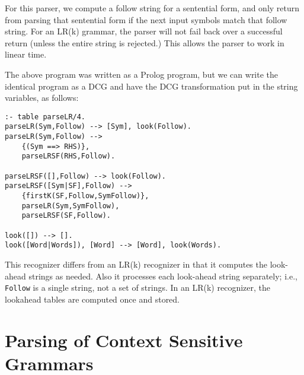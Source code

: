 For this parser, we compute a follow string for a sentential form, and
only return from parsing that sentential form if the next input
symbols match that follow string.  For an LR(k) grammar, the parser
will not fail back over a successful return (unless the entire string
is rejected.)  This allows the parser to work in linear time.

The above program was written as a Prolog program, but we can write
the identical program as a DCG and have the DCG transformation put in
the string variables, as follows:
\begin{verbatim}
:- table parseLR/4.
parseLR(Sym,Follow) --> [Sym], look(Follow).
parseLR(Sym,Follow) -->
    {(Sym ==> RHS)},
    parseLRSF(RHS,Follow).

parseLRSF([],Follow) --> look(Follow).
parseLRSF([Sym|SF],Follow) -->
    {firstK(SF,Follow,SymFollow)},
    parseLR(Sym,SymFollow),
    parseLRSF(SF,Follow).

look([]) --> [].
look([Word|Words]), [Word] --> [Word], look(Words).
\end{verbatim}

This recognizer differs from an LR(k) recognizer in that it computes
the look-ahead strings as needed.  Also it processes each look-ahead
string separately; i.e., \verb|Follow| is a single string, not a set
of strings.  In an LR(k) recognizer, the lookahead tables are computed
once and stored.  

\section{Parsing of Context Sensitive Grammars}

